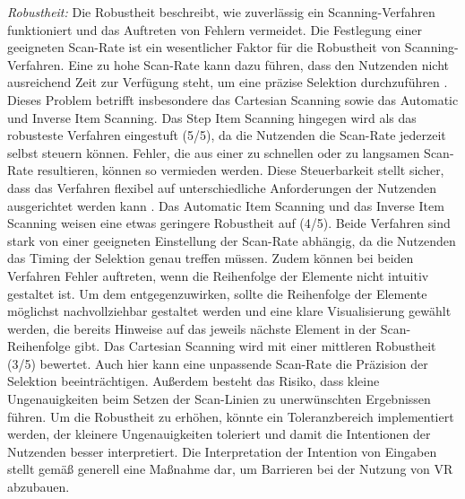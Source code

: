 \textit{Robustheit:}
Die Robustheit beschreibt, wie zuverlässig ein Scanning-Verfahren funktioniert und das Auftreten von Fehlern vermeidet. Die Festlegung einer geeigneten Scan-Rate ist ein wesentlicher Faktor für die Robustheit von Scanning-Verfahren. Eine zu hohe Scan-Rate kann dazu führen, dass den Nutzenden nicht ausreichend Zeit zur Verfügung steht, um eine präzise Selektion durchzuführen \citep{COOK2015117}. Dieses Problem betrifft insbesondere das Cartesian Scanning sowie das Automatic und Inverse Item Scanning. Das Step Item Scanning hingegen wird als das robusteste Verfahren eingestuft (5/5), da die Nutzenden die Scan-Rate jederzeit selbst steuern können. Fehler, die aus einer zu schnellen oder zu langsamen Scan-Rate resultieren, können so vermieden werden. Diese Steuerbarkeit stellt sicher, dass das Verfahren flexibel auf unterschiedliche Anforderungen der Nutzenden ausgerichtet werden kann \citep{COOK2015117}.
Das Automatic Item Scanning und das Inverse Item Scanning weisen eine etwas geringere Robustheit auf (4/5). Beide Verfahren sind stark von einer geeigneten Einstellung der Scan-Rate abhängig, da die Nutzenden das Timing der Selektion genau treffen müssen. Zudem können bei beiden Verfahren Fehler auftreten, wenn die Reihenfolge der Elemente nicht intuitiv gestaltet ist. Um dem entgegenzuwirken, sollte die Reihenfolge der Elemente möglichst nachvollziehbar gestaltet werden und eine klare Visualisierung gewählt werden, die bereits Hinweise auf das jeweils nächste Element in der Scan-Reihenfolge gibt.
Das Cartesian Scanning wird mit einer mittleren Robustheit (3/5) bewertet. Auch hier kann eine unpassende Scan-Rate die Präzision der Selektion beeinträchtigen. Außerdem besteht das Risiko, dass kleine Ungenauigkeiten beim Setzen der Scan-Linien zu unerwünschten Ergebnissen führen. Um die Robustheit zu erhöhen, könnte ein Toleranzbereich implementiert werden, der kleinere Ungenauigkeiten toleriert und damit die Intentionen der Nutzenden besser interpretiert. Die Interpretation der Intention von Eingaben stellt gemäß \citet{dombrowski_designing_2019} generell eine Maßnahme dar, um Barrieren bei der Nutzung von VR abzubauen. 


